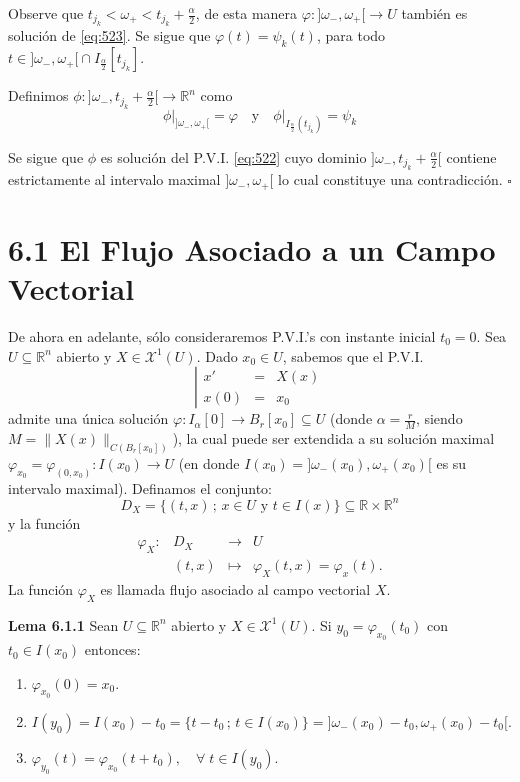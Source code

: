 \documentclass[11pt,a4paper]{article}
\theoremstyle{definition}
\theoremstyle{plain}
\theoremstyle{remark}
\begin{document}
	Observe que $t_{j_k} < \omega_+ < t_{j_k} + \frac{\alpha}{2}$, de esta manera $\varphi : {]\omega_-, \omega_+[} \to U$
	también es solución de \eqref{eq:523}. Se sigue que $\varphi(t) = \psi_k(t)$, para todo $t \in {]\omega_-, \omega_+[} \cap I_{\frac{\alpha}{2}}[t_{j_k}]$.
	
	Definimos $\phi : {]\omega_-, t_{j_k} + \frac{\alpha}{2}[} \to \mathbb{R}^n$ como
	\[
	\left.\phi\right|_{]\omega_-, \omega_+[} = \varphi \quad \text{y} \quad \left.\phi\right|_{I_{\frac{\alpha}{2}}(t_{j_k})} = \psi_k
	\]
	
	Se sigue que $\phi$ es solución del P.V.I. \eqref{eq:522} cuyo dominio ${]\omega_-, t_{j_k} + \frac{\alpha}{2}[}$ contiene estrictamente al intervalo maximal ${]\omega_-, \omega_+[}$ lo cual constituye una contradicción. \hfill $\square$
	
	\section*{6.1 El Flujo Asociado a un Campo Vectorial}
	
	De ahora en adelante, sólo consideraremos P.V.I.'s con instante inicial $t_0 = 0$. Sea $U \subseteq \mathbb{R}^n$ abierto y $X \in \mathcal{X}^1(U)$. Dado $x_0 \in U$, sabemos que el P.V.I.
	\begin{equation}\label{eq:61}
		\left| 
		\begin{array}{lcl}
			x' &=& X(x) \\
			x(0) &=& x_0
		\end{array}
		\right.
	\end{equation}
	admite una única solución $\varphi : I_\alpha[0] \to B_r[x_0] \subseteq U$ (donde $\alpha = \frac{r}{M}$, siendo $M = \|X(x)\|_{C(B_r[x_0])}$), la cual puede ser extendida a su solución maximal $\varphi_{x_0} = \varphi_{(0,x_0)} : I(x_0) \to U$ (en donde $I(x_0) = {]\omega_-(x_0), \omega_+(x_0)[}$ es su intervalo maximal). Definamos el conjunto:
	\[
	D_X = \{(t,x) \,;\, x \in U \text{ y } t \in I(x)\} \subseteq \mathbb{R} \times \mathbb{R}^n
	\]
	y la función
	\[
	\begin{array}{rccc}
		\varphi_X : & D_X & \to & U \\
		& (t, x) & \mapsto & \varphi_X(t, x) = \varphi_x(t).
	\end{array}
	\]
	La función $\varphi_X$ es llamada flujo asociado al campo vectorial $X$.
	
	\noindent \textbf{Lema 6.1.1} Sean $U \subseteq \mathbb{R}^n$ abierto y $X \in \mathcal{X}^1(U)$. Si $y_0 = \varphi_{x_0}(t_0)$ con $t_0 \in I(x_0)$ entonces:
	\begin{enumerate}
		\item[\textnormal{i)}] $\varphi_{x_0}(0) = x_0$.
		\item[\textnormal{ii)}] $I(y_0) = I(x_0) - t_0 = \{t - t_0 \,;\, t \in I(x_0)\} = {]\omega_-(x_0) - t_0, \omega_+(x_0) - t_0[}$.
		\item[\textnormal{iii)}] $\varphi_{y_0}(t) = \varphi_{x_0}(t + t_0), \quad \forall \; t \in I(y_0)$.
	\end{enumerate}
	
\end{document}

